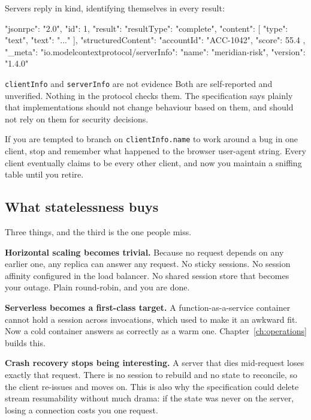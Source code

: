 Servers reply in kind, identifying themselves in every result:

\begin{wire}
{
  "jsonrpc": "2.0",
  "id": 1,
  "result": {
    "resultType": "complete",
    "content": [{ "type": "text", "text": "..." }],
    "structuredContent": { "accountId": "ACC-1042", "score": 55.4 },
    "_meta": {
      "io.modelcontextprotocol/serverInfo": {
        "name": "meridian-risk",
        "version": "1.4.0"
      }
    }
  }
}
\end{wire}

\begin{notebox}{\texttt{clientInfo} and \texttt{serverInfo} are not evidence}
Both are self-reported and unverified. Nothing in the protocol checks them. The
specification says plainly that implementations should not change behaviour
based on them, and should not rely on them for security decisions.

If you are tempted to branch on \texttt{clientInfo.name} to work around a bug in
one client, stop and remember what happened to the browser user-agent string.
Every client eventually claims to be every other client, and now you maintain a
sniffing table until you retire.
\end{notebox}

\subsection{What statelessness buys}

Three things, and the third is the one people miss.

\textbf{Horizontal scaling becomes trivial.} Because no request depends on any
earlier one, any replica can answer any request. No sticky sessions. No session
affinity configured in the load balancer. No shared session store that becomes
your outage. Plain round-robin, and you are done.

\textbf{Serverless becomes a first-class target.} A function-as-a-service
container cannot hold a session across invocations, which used to make it an
awkward fit. Now a cold container answers as correctly as a warm one.
Chapter~\ref{ch:operations} builds this.

\textbf{Crash recovery stops being interesting.} A server that dies mid-request
loses exactly that request. There is no session to rebuild and no state to
reconcile, so the client re-issues and moves on. This is also why the
specification could delete stream resumability without much drama: if the state
was never on the server, losing a connection costs you one request.

